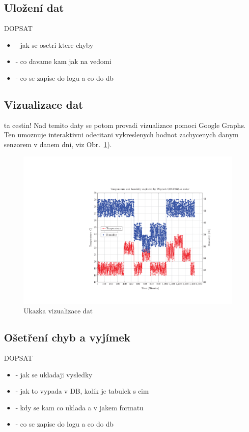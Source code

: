 \subsection{Uložení dat}
\colorbox[rgb]{1,0,0}{DOPSAT}
\begin{itemize}
\item - jak se osetri ktere chyby
\item - co davame kam jak na vedomi
\item - co se zapise do logu a co do db
\end{itemize}

\subsection{Vizualizace dat}
\colorbox[rgb]{1,0,0}{ta cestin!}
Nad temito daty se potom provadi vizualizace pomoci Google Graphs. Ten umoznuje interaktivni odecitani vykreslenych hodnot zachycenych danym senzorem v danem dni, viz Obr.~\ref{fig_sec4_chart_example}). 

 \begin{figure}[!ht]
  \begin{center}
    \includegraphics[scale=0.3]{obrazky/chart_weptech}
  \end{center}
  \caption{Ukazka vizualizace dat}
	\label{fig_sec4_chart_example}
\end{figure}

\subsection{Ošetření chyb a vyjímek}
\colorbox[rgb]{1,0,0}{DOPSAT}
\begin{itemize}
\item - jak se ukladaji vysledky
\item - jak to vypada v DB, kolik je tabulek s cim
\item - kdy se kam co uklada a v jakem formatu
\item - co se zapise do logu a co do db
\end{itemize}

